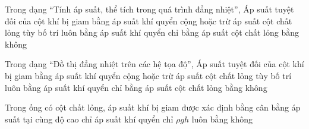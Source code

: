 \begin{ex}
Trong dạng “Tính áp suất, thể tích trong quá trình đẳng nhiệt”, Áp suất tuyệt đối của cột khí bị giam bằng
\choice
{\True áp suất khí quyển cộng hoặc trừ áp suất cột chất lỏng tùy bố trí}
{luôn bằng áp suất khí quyển}
{chỉ bằng áp suất cột chất lỏng}
{bằng không}
\end{ex}

\begin{ex}
Trong dạng “Đồ thị đẳng nhiệt trên các hệ tọa độ”, Áp suất tuyệt đối của cột khí bị giam bằng
\choice
{\True áp suất khí quyển cộng hoặc trừ áp suất cột chất lỏng tùy bố trí}
{luôn bằng áp suất khí quyển}
{chỉ bằng áp suất cột chất lỏng}
{bằng không}
\end{ex}

\begin{ex}
Trong ống có cột chất lỏng, áp suất khí bị giam được xác định bằng
\choice
{\True cân bằng áp suất tại cùng độ cao}
{chỉ áp suất khí quyển}
{chỉ $\rho gh$}
{luôn bằng không}
\end{ex}
